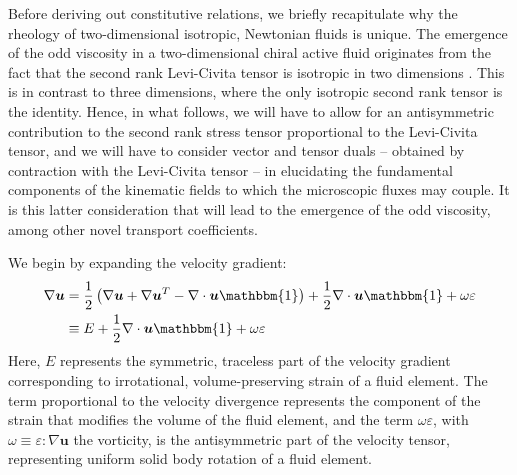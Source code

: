 \documentclass[%
 reprint,
superscriptaddress,
longbibliography,
 amsmath,amssymb,
 prl,
 citeautoscript,
]{revtex4-1}
\begin{document}
Before deriving out constitutive relations, we briefly recapitulate why the rheology of two-dimensional isotropic, Newtonian fluids is unique. The emergence of the odd viscosity in a two-dimensional chiral active fluid originates from the fact that the second rank Levi-Civita tensor is isotropic in two dimensions \cite{Avron}. This is in contrast to three dimensions, where the only isotropic second rank tensor is the identity. Hence, in what follows, we will have to allow for an antisymmetric contribution to the second rank stress tensor proportional to the Levi-Civita tensor, and we will have to consider vector and tensor duals -- obtained by contraction with the Levi-Civita tensor -- in elucidating the fundamental components of the kinematic fields to which the microscopic fluxes may couple. It is this latter consideration that will lead to the emergence of the odd viscosity, among other novel transport coefficients.

We begin by expanding the velocity gradient:
\begin{equation}
\begin{split}
\nabla {\boldsymbol u} &= \frac{1}{2} \left( \nabla {\boldsymbol u} + \nabla {\boldsymbol u}^T - \nabla \cdot {\boldsymbol u} \mathbbm{1} \right) + \frac{1}{2} \nabla \cdot {\boldsymbol u} \mathbbm{1} + \omega \varepsilon \\
&\equiv E + \frac{1}{2} \nabla \cdot {\boldsymbol u} \mathbbm{1} + \omega \varepsilon
\end{split}
\label{eqn:strain_decomp}
\end{equation}
Here, $E$ represents the symmetric, traceless part of the velocity gradient corresponding to irrotational, volume-preserving strain of a fluid element. The term proportional to the velocity divergence represents the component of the strain that modifies the volume of the fluid element, and the term $\omega \varepsilon$, with $\omega \equiv \varepsilon : \nabla {\boldsymbol u}$ the vorticity, is the antisymmetric part of the velocity tensor, representing uniform solid body rotation of a fluid element.
\end{document}
